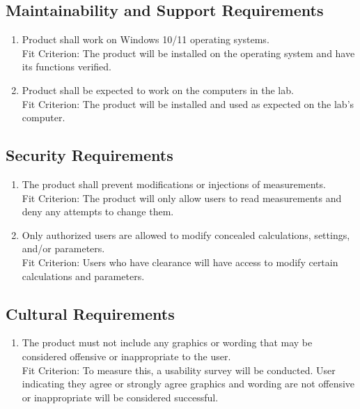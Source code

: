 \documentclass[12pt, titlepage]{article}
\begin{document}
\subsection{Maintainability and Support Requirements}
\begin{adjustwidth}{2.2em}{0pt}
\begin{enumerate}[{NFR-M}1.] 
  \item Product shall work on Windows 10/11 operating systems.\\ \label{NFR-M1}
  Fit Criterion: The product will be installed on the operating system and have its functions verified.
  \item Product shall be expected to work on the computers in the lab.\\ \label{NFR-M2}
  Fit Criterion: The product will be installed and used as expected on the lab's computer.
\end{enumerate} 
\end{adjustwidth}

\subsection{Security Requirements}
\begin{adjustwidth}{2.0em}{0pt}
\begin{enumerate}[{NFR-S}1.]
  \item The product shall prevent modifications or injections of measurements.\\ \label{NFR-S1}
  Fit Criterion: The product will only allow users to read measurements and deny any attempts to change them.
  \item Only authorized users are allowed to modify concealed calculations, settings, and/or parameters.\\ \label{NFR-S2}
  Fit Criterion: Users who have clearance will have access to modify certain calculations and parameters.
\end{enumerate}
\end{adjustwidth}

\subsection{Cultural Requirements}
\begin{adjustwidth}{2.2em}{0pt}
\begin{enumerate}[{NFR-C}1.]
    \item The product must not include any graphics or wording that may be considered offensive or inappropriate to the user.\\ \label{NFR-C1}
    Fit Criterion: To measure this, a usability survey will be conducted. User indicating they agree or strongly agree graphics and wording are not offensive or inappropriate will be considered successful.
\end{enumerate}
\end{adjustwidth}
\end{document}

